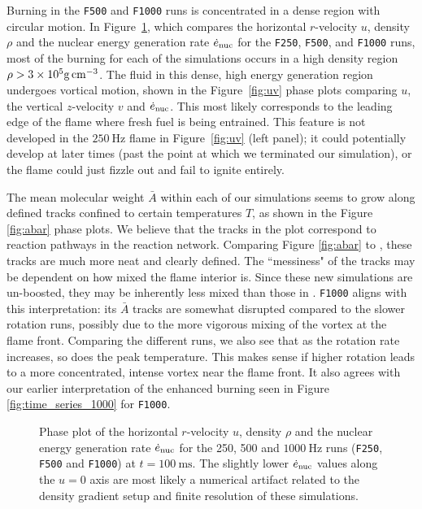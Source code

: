 \documentclass[preprint,times,tighten]{aastex63}
\begin{document}
Burning in the {\tt F500} and {\tt F1000} runs is concentrated in a dense region with circular 
motion. In Figure~\ref{fig:urho}, which compares the horizontal $r$-velocity $u$, density $\rho$ and the 
nuclear energy generation rate $\dot{e}_{\rm nuc}$ for the {\tt F250}, {\tt F500}, and {\tt F1000} 
runs, most of the burning for each of the simulations occurs in a high density region $\rho > 3 
\times 10^5 {\rm g\,cm^{-3}}$. The fluid in this dense, high energy generation region undergoes 
vortical motion, shown in the Figure~\ref{fig:uv} phase plots comparing $u$, the vertical $z$-velocity $v$ and $\dot{e}_{\rm 
nuc}$. This most likely corresponds to the leading edge of the flame where fresh fuel is being entrained.
This feature is not developed in the $250~\mathrm{Hz}$ flame in Figure~\ref{fig:uv} (left panel); it could potentially develop 
at later times (past the point at which we terminated our simulation), or the flame could just 
fizzle out and fail to ignite entirely. 

The mean molecular weight $\bar{A}$ within each of our simulations seems to grow along defined tracks confined to certain temperatures $T$, as shown in the Figure \ref{fig:abar} phase plots. We believe that the tracks in the plot correspond to reaction pathways in the reaction network. Comparing Figure \ref{fig:abar} to \citet{flame_wave1}, these tracks are much more neat and clearly defined. The ``messiness" of the tracks may be dependent on how mixed the flame interior is. Since these new simulations are un-boosted, they may be inherently less mixed than those in \citet{flame_wave1}. {\tt F1000} aligns with this interpretation: its $\bar{A}$ tracks are somewhat disrupted compared to the slower rotation runs, possibly due to the more vigorous mixing of the vortex at the flame front. Comparing the different runs, we also see that as the rotation rate increases, so does the peak temperature. This makes sense if higher rotation leads to a more concentrated, intense vortex near the flame front. It also agrees with our earlier interpretation of the enhanced burning seen in Figure \ref{fig:time_series_1000} for {\tt F1000}. 

\begin{figure}[t]
    \centering
    \caption{\label{fig:urho}Phase plot of the horizontal $r$-velocity $u$, density $\rho$ and the nuclear energy generation rate $\dot{e}_{\rm nuc}$ for the 250, 500 and $1000~\mathrm{Hz}$ runs ({\tt F250}, {\tt F500} and {\tt F1000}) at $t = 100~\mathrm{ms}$. The slightly lower $\dot{e}_{\rm nuc}$ values along the $u = 0$ axis are most likely a numerical artifact related to the density gradient setup and finite resolution of these simulations.}
\end{figure}
\end{document}
